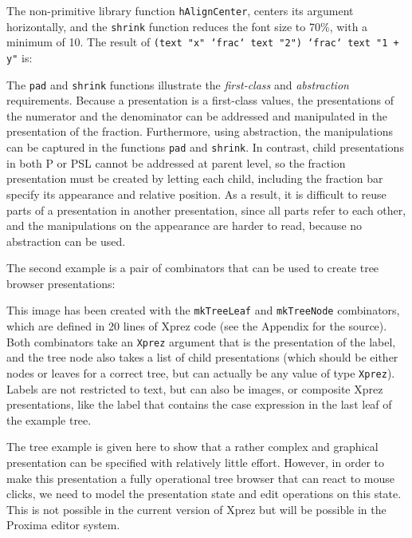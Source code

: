 \par \noindent The non-primitive library function
        \texttt{hAlignCenter}, centers its argument horizontally, and the
        \texttt{shrink} function reduces the font size to 70\%, with a minimum of
        10. The result of \texttt{(text "x" `frac` text "2") `frac` text "1 + y"}
        is:\begin{center}
\end{center}
\par The \texttt{pad} and \texttt{shrink} functions illustrate the
        {\em first-class} and {\em abstraction} requirements. Because a
        presentation is a first-class values, the presentations of the numerator and
        the denominator can be addressed and manipulated in the presentation of the
        fraction. Furthermore, using abstraction, the manipulations can be captured in
        the functions \texttt{pad} and \texttt{shrink}. In contrast, child
        presentations in both P or PSL cannot be addressed at parent level, so the
        fraction presentation must be created by letting each child, including the
        fraction bar specify its appearance and relative position. As a result, it is
        difficult to reuse parts of a presentation in another presentation, since all
        parts refer to each other, and the manipulations on the appearance are harder
        to read, because no abstraction can be used. 
\par The second example is a pair of combinators that can be used to create
        tree browser presentations:\begin{center}
\end{center}
\par \noindent This image has been created with the
        \texttt{mkTreeLeaf} and \texttt{mkTreeNode} combinators, which are defined in
        20 lines of {\sc Xprez} code (see the Appendix for the source). Both
        combinators take an \texttt{Xprez} argument that is the presentation of the
        label, and the tree node also takes a list of child presentations (which should
        be either nodes or leaves for a correct tree, but can actually be any value of
        type \texttt{Xprez}). Labels are not restricted to text, but can also be
        images, or composite {\sc Xprez} presentations, like the label that contains
        the case expression in the last leaf of the example tree. 
\par The tree example is given here to show that a rather complex and
        graphical presentation can be specified with relatively little effort. However,
        in order to make this presentation a fully operational tree browser that can
        react to mouse clicks, we need to model the presentation state and edit
        operations on this state. This is not possible in the current version of
        {\sc Xprez} but will be possible in the Proxima editor system.
